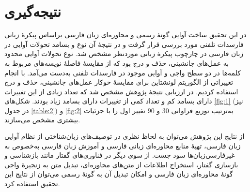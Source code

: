 \documentclass[12pt,onecolumn,a4paper]{article}
\begin{document}
    \section{نتیجه‌گیری}
    در این تحقیق ساخت آوایی گونهٔ رسمی و محاوره‌ای زبان فارسی براساس پیکرهٔ زبانی فارسدات تلفنی مورد بررسی قرار گرفت و در نتیجهٔ آن نوع و بسامد تحولات آوایی در زبان فارسی در چارچوب پیکرهٔ زبانی موردنظر مشخص شد. نوع تحولات آوایی محدود به عمل‌های جانشینی، حذف و درج بود که از مقایسهٔ فاصلهٔ نویسه‌های مربوط به کلمه‌ها در دو سطح واجی و آوایی موجود در فارسدات تلفنی به‌دست می‌آمد. با انجام تغییراتی از الگوریتم لونشتاین برای مقایسهٔ خوکار عمل‌های جانشینی، حذف و درج استفاده کردیم. در ارزیابی نتیجهٔ پژوهش مشخص شد که تعداد زیادی از این تغییرات دارای بسامد کم و تعداد کمی از تغییرات دارای بسامد زیاد بودند. شکل‌های \ref{fig:1} (نیز در جدول \ref{table:2}) و \ref{fig:2} به‌ترتیب توزیع فراوانی 30 و 90 تغییر اول را با جزئیات بیشتری مشخص می‌سازند.
    \par
    از نتایج این پژوهش می‌توان به لحاظ نظری در توصیف‌های زبان‌شناختی از نظام آوایی زبان فارسی، تهیهٔ منابع محاوره‌ای زبانی فارسی و آموزش زبان فارسی به‌خصوص به غیرفارسی‌زبان‌ها سود جست. از سوی دیگر در فناوری‌های گفتار مانند بازشناسی و بازسازی گفتار، استخراج اطلاعات از متن‌های محاوره‌ای، تبدیل متن به زنجیرهٔ واجی گونهٔ محاوره‌ای زبان فارسی و امکان تبدیل آن به گونهٔ رسمی می‌توان از نتایج این تحقیق استفاده کرد.

    {\mfo
    
    }
\end{document}
